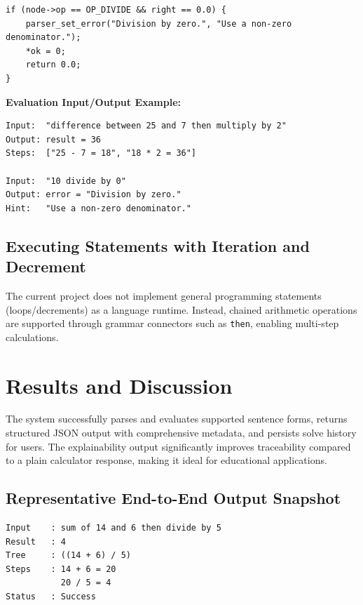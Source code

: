 \documentclass[12pt,a4paper]{report}
\begin{document}
\begin{lstlisting}[style=ccode,caption={Evaluation guard from src/evaluator.c}]
if (node->op == OP_DIVIDE && right == 0.0) {
    parser_set_error("Division by zero.", "Use a non-zero denominator.");
    *ok = 0;
    return 0.0;
}
\end{lstlisting}

\textbf{Evaluation Input/Output Example:}
\begin{lstlisting}[style=ccode,caption={Result examples from evaluator stage}]
Input:  "difference between 25 and 7 then multiply by 2"
Output: result = 36
Steps:  ["25 - 7 = 18", "18 * 2 = 36"]

Input:  "10 divide by 0"
Output: error = "Division by zero."
Hint:   "Use a non-zero denominator."
\end{lstlisting}

\subsection{Executing Statements with Iteration and Decrement}

The current project does not implement general programming statements (loops/decrements)
as a language runtime. Instead, chained arithmetic operations are supported through grammar
connectors such as \texttt{then}, enabling multi-step calculations.

\section{Results and Discussion}

The system successfully parses and evaluates supported sentence forms, returns structured
JSON output with comprehensive metadata, and persists solve history for users. The explainability output significantly
improves traceability compared to a plain calculator response, making it ideal for educational applications.

\subsection{Representative End-to-End Output Snapshot}

\begin{lstlisting}[style=phpcode,caption={Web-visible solve output (simplified)}]
Input    : sum of 14 and 6 then divide by 5
Result   : 4
Tree     : ((14 + 6) / 5)
Steps    : 14 + 6 = 20
           20 / 5 = 4
Status   : Success
\end{lstlisting}
\end{document}
